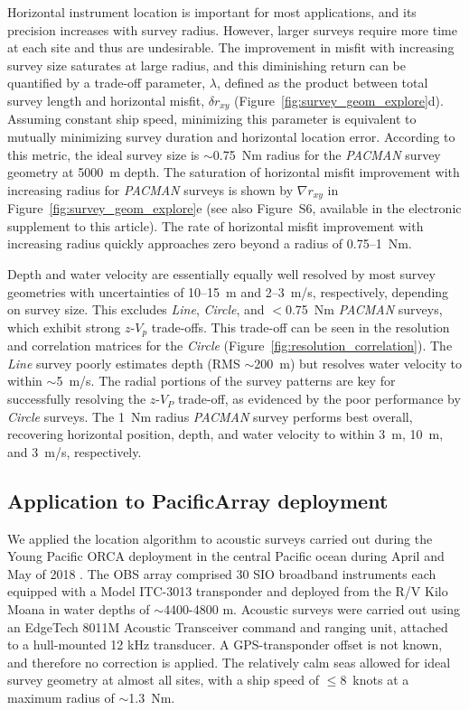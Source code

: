 Horizontal instrument location is important for most applications, and its precision increases with survey radius. However, larger surveys require more time at each site and thus are undesirable. The improvement in misfit with increasing survey size saturates at large radius, and this diminishing return can be quantified by a trade-off parameter, $\lambda$, defined as the product between total survey length and horizontal misfit, $\delta r_{xy}$ (Figure~\ref{fig:survey_geom_explore}d). Assuming constant ship speed, minimizing this parameter is equivalent to mutually minimizing survey duration and horizontal location error. According to this metric, the ideal survey size is $\sim$0.75~Nm radius for the \textit{PACMAN} survey geometry at 5000~m depth. The saturation of horizontal misfit improvement with increasing radius for \textit{PACMAN} surveys is shown by $\nabla r_{xy}$ in Figure~\ref{fig:survey_geom_explore}e (see also Figure~S6, available in the electronic supplement to this article). The rate of horizontal misfit improvement with increasing radius quickly approaches zero beyond a radius of 0.75--1~Nm.

Depth and water velocity are essentially equally well resolved by most survey geometries with uncertainties of 10--15~m and 2--3~m/s, respectively, depending on survey size. This excludes \textit{Line}, \textit{Circle}, and $<$0.75~Nm \textit{PACMAN} surveys, which exhibit strong $z$-$V_p$ trade-offs. This trade-off can be seen in the resolution and correlation matrices for the \textit{Circle} (Figure~\ref{fig:resolution_correlation}). The \textit{Line} survey poorly estimates depth (RMS $\sim$200~m) but resolves water velocity to within $\sim$5~m/s. The radial portions of the survey patterns are key for successfully resolving the $z$-$V_P$ trade-off, as evidenced by the poor performance by \textit{Circle} surveys. The 1~Nm radius \textit{PACMAN} survey performs best overall, recovering horizontal position, depth, and water velocity to within 3~m, 10~m, and 3~m/s, respectively.


\subsection{Application to PacificArray deployment} \label{sec:PacificArray_deployment}
We applied the location algorithm to acoustic surveys carried out during the Young Pacific ORCA deployment in the central Pacific ocean during April and May of 2018 \citep{Gaherty2018}. The OBS array comprised 30 SIO broadband instruments each equipped with a Model ITC-3013 transponder and deployed from the R/V Kilo Moana in water depths of $\sim$4400-4800 m. Acoustic  surveys were carried out using an EdgeTech 8011M Acoustic Transceiver command and ranging unit, attached to a hull-mounted 12 kHz transducer. A GPS-transponder offset is not known, and therefore no correction is applied. The relatively calm seas allowed for ideal survey geometry at almost all sites, with a ship speed of \mbox{$\le$8~knots} at a maximum radius of \mbox{$\sim$1.3~Nm}. 

